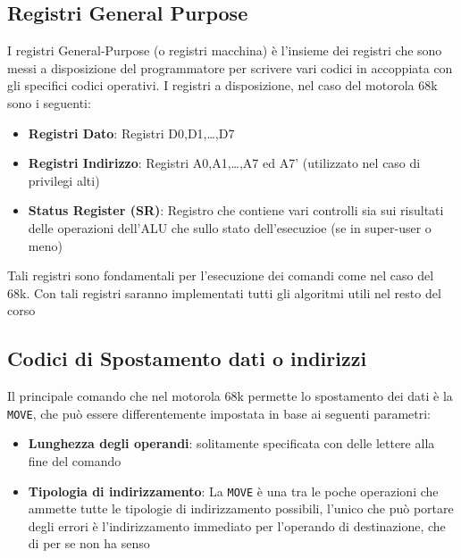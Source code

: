 \subsection{Registri General Purpose}
I registri General-Purpose (o registri macchina) è l'insieme dei registri che sono messi a disposizione del programmatore per scrivere vari codici in accoppiata con gli specifici codici operativi.
I registri a disposizione, nel caso del motorola 68k sono i seguenti:
\begin{itemize}
    \item \textbf{Registri Dato}: Registri D0,D1,\dots,D7
    \item \textbf{Registri Indirizzo}: Registri A0,A1,\dots,A7 ed A7' (utilizzato nel caso di privilegi alti)
    \item \textbf{Status Register (SR)}: Registro che contiene vari controlli sia sui risultati delle operazioni dell'ALU che sullo stato dell'esecuzioe (se in super-user o meno)
\end{itemize}

Tali registri sono fondamentali per l'esecuzione dei comandi come nel caso del 68k. Con tali registri saranno implementati tutti gli algoritmi utili nel resto del corso

\subsection{Codici di Spostamento dati o indirizzi}
Il principale comando che nel motorola 68k permette lo spostamento dei dati è la \lstinline|MOVE|, che può essere differentemente impostata in base ai seguenti parametri:

\begin{itemize}
    \item \textbf{Lunghezza degli operandi}: solitamente specificata con delle lettere alla fine del comando
    \item \textbf{Tipologia di indirizzamento}: La \lstinline|MOVE| è una tra le poche operazioni che ammette tutte le tipologie di indirizzamento possibili, l'unico che può portare degli errori è l'indirizzamento immediato per l'operando di destinazione, che di per se non ha senso
\end{itemize}


